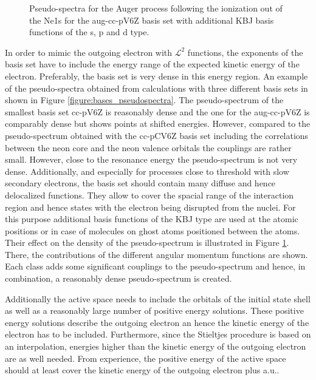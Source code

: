 \begin{figure}[ht]
  \centering
  
  \caption{Pseudo-spectra for the Auger process following the ionization
           out of the Ne1s for the aug-cc-pV6Z basis set with additional
           \ac{KBJ} basis functions of the s, p and d type.}
  \label{figure:bases_jungen}
\end{figure}

In order to mimic the outgoing electron with $\mathcal{L}^2$ functions, the
exponents of the basis set have to include the energy range of the expected
kinetic energy of the electron. Preferably, the basis set is very dense in
this energy region. 
An example of the pseudo-spectra obtained from calculations with three
different basis sets in shown in Figure \ref{figure:bases_pseudospectra}.
The pseudo-spectrum of the smallest basis set cc-pV6Z is reasonably dense and
the one for the aug-cc-pV6Z is comparably dense but shows points at shifted
energies. However, compared to the pseudo-spectrum obtained with the cc-pCV6Z
basis set including the correlations between the neon core and the neon valence
orbitals the couplings are rather small. However, close to the resonance energy
the pseudo-spectrum is not very dense.
Additionally, and especially for processes close to threshold     
with slow                                                               
secondary electrons, the basis set should contain many diffuse and hence
delocalized functions.
They allow to cover the spacial range of the interaction
region and hence states with the electron being disrupted from the nuclei.
For this purpose additional basis functions of the \ac{KBJ}\cite{Kaufmann89}
type are used at the atomic positions or in case of molecules on ghost atoms
positioned between the atoms. Their effect on the density of the pseudo-spectrum
is illustrated in Figure \ref{figure:bases_jungen}. There, the contributions of the
different angular momentum functions are shown. Each class adds some significant
couplings to the pseudo-spectrum and hence, in combination, a reasonably dense
pseudo-spectrum is created.

Additionally the active space needs to include the orbitals of the initial state
shell as well as a reasonably large number of positive energy solutions. These
positive energy solutions describe the outgoing electron an hence the kinetic energy
of the electron has to be included. Furthermore, since the Stieltjes procedure is
based on an interpolation, energies higher than the kinetic energy of the outgoing
electron are as well needed. From experience, the positive energy of the active
space should at least cover the kinetic energy of the outgoing electron plus
\unit[10]{a.u.}.



